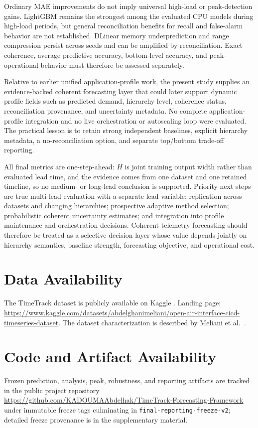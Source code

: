 \documentclass[a4paper,fleqn]{cas-dc}
\begin{document}
Ordinary {MAE} improvements do not imply universal high-load or peak-detection
gains.
LightGBM remains the strongest among the evaluated {CPU} models during
high-load periods, but general reconciliation benefits for recall and
false-alarm behavior are not established.
DLinear memory underprediction and range compression persist across seeds and
can be amplified by reconciliation.
Exact coherence, average predictive accuracy, bottom-level accuracy, and
peak-operational behavior must therefore be assessed separately.

Relative to earlier unified application-profile work, the present study
supplies an evidence-backed coherent forecasting layer that could later support
dynamic profile fields such as predicted demand, hierarchy level, coherence
status, reconciliation provenance, and uncertainty metadata.
No complete application-profile integration and no live orchestration or
autoscaling loop were evaluated.
The practical lesson is to retain strong independent baselines, explicit
hierarchy metadata, a no-reconciliation option, and separate top/bottom
trade-off reporting.

All final metrics are one-step-ahead: $H$ is joint training output width rather
than evaluated lead time, and the evidence comes from one dataset and one
retained timeline, so no medium- or long-lead conclusion is supported.
Priority next steps are true multi-lead evaluation with a separate lead
variable; replication across datasets and changing hierarchies; prospective
adaptive method selection; probabilistic coherent uncertainty estimates; and
integration into profile maintenance and orchestration decisions.
Coherent telemetry forecasting should therefore be treated as a selective
decision layer whose value depends jointly on hierarchy semantics, baseline
strength, forecasting objective, and operational cost.

\section*{Data Availability}
The TimeTrack dataset is publicly available on Kaggle
\cite{meliani2025timetrackkaggle}.
Landing page:
\url{https://www.kaggle.com/datasets/abdelghanimeliani/open-air-interface-cicd-timeseries-dataset}.
The dataset characterization is described by Meliani et al.\
\cite{meliani2025timetrack}.

\section*{Code and Artifact Availability}
Frozen prediction, analysis, peak, robustness, and reporting artifacts are
tracked in the public project repository
\url{https://github.com/KADOUMAAbdelhak/TimeTrack-Forecasting-Framework}
under immutable freeze tags culminating in
\texttt{final-reporting-\allowbreak freeze-v2}; detailed freeze provenance is in
the supplementary material.
\end{document}
